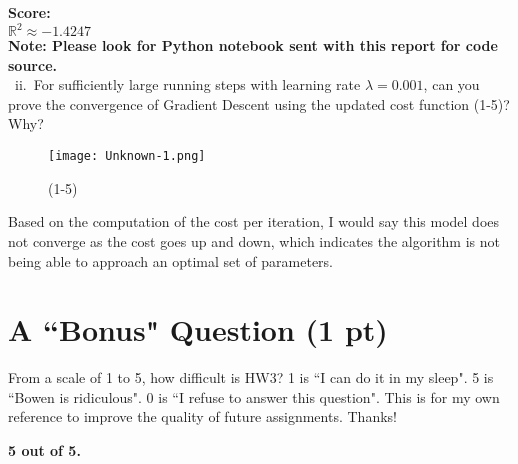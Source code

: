 \documentclass{assignment}
\newcommand{\R}{\mathbb{R}}
\begin{document}
\begin{problem}
\begin{enumerate}
\begin{enumerate}
    \textbf{Score:}\\
    $\R^2 \approx -1.4247$\\

    \textbf{Note: Please look for Python notebook sent with this report for code source.}\\
    
    \ ii.\ For sufficiently large running steps with learning rate $\lambda = 0.001$, can you prove the convergence of Gradient Descent using the updated cost function (1-5)? Why?

    \begin{figure}[H]
        \centering
        \texttt{[image: Unknown-1.png]}
        \caption{(1-5)}
        \label{fig:enter-label}
    \end{figure}

    Based on the computation of the cost per iteration, I would say this model does not converge as the cost goes up and down, which indicates the algorithm is not being able to approach an optimal set of parameters.\\
\end{enumerate}
\end{enumerate}
\section{A ``Bonus" Question (1 pt)}
\noindent From a scale of 1 to 5, how difficult is HW3? 1 is ``I can do it in my sleep". 5 is ``Bowen is ridiculous". 0 is ``I refuse to answer this question". This is for my own reference to improve the quality of future assignments. Thanks!

\textbf{5 out of 5.}
    
\end{problem}
\end{document}

